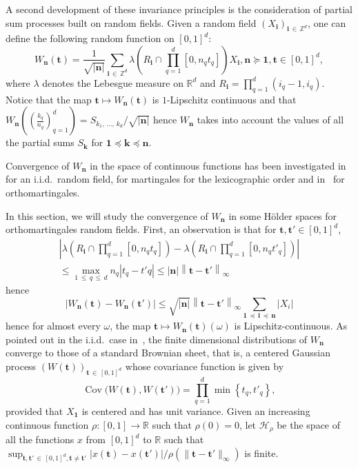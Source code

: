 \documentclass[AHL,Unicode,longabstracts,published]{cedram}
\newcommand{\Hca}{\mathcal{H}}
\newcommand\R{\mathbb{R}}
\newcommand\Z{\mathbb{Z}}
\newcommand\abs[1]{|#1|}
\newcommand{\pr}[1]{(#1)}
\newcommand{\norm}[1]{\lVert #1\rVert}
\newcommand{\gr}[1]{\bm{#1}}
\newcommand{\gri}{\bm{i}}
\newcommand{\grn}{\bm{n}}
\newcommand{\grk}{\bm{k}}
\newcommand{\grt}{\bm{t}}
\newcommand{\imd}{\preccurlyeq}
\newcommand{\smd}{\succcurlyeq }
\begin{document}
A second development of these invariance principles is the consideration of partial sum processes built on random fields. Given a random field $\pr{X_{\gri}}_{\gri\,\in\,\Z^d}$, one can define the following random function on $[0,1]^d$:
\begin{equation}
W_{\grn}\left(\grt\right)=\frac 1{\sqrt{\left|\grn\right|}}
\sum_{\gri\,\in\,\Z^d}
\lambda\left(R_{\gri}\cap \prod_{q=1}^d \left[0,n_qt_q\right]\right) X_{\gri}, \grn\smd\gr{1}, \grt \in [0,1]^d,
\end{equation}
where $\lambda$ denotes the Lebesgue measure on $\R^d$ and $R_{\gri}=\prod_{q=1}^d\pr{ i_q-1,i_q}$. Notice that the map $\grt\mapsto W_{\grn}\pr{\grt}$ is $1$-Lipschitz continuous and that $W_{\grn}\pr{\pr{\frac{k_q}{n_q}}_{q=1}^d}=S_{k_1,\,\dots,\,k_d}/\sqrt{\abs{\grn}}$ hence $W_{\grn}$ takes into account the values of all the partial sums $S_{\grk}$ for $\gr{1}\imd\gr{k}\imd\grn$.

Convergence of $W_{\grn}$ in the space of continuous functions has been investigated in~\cite{MR0246359} for an i.i.d.\ random field, \cite{MR1875665} for martingales for the lexicographic order and in~\cite{MR3427925,MR3913270} for orthomartingales.

In this section, we will study the convergence of $W_{\grn}$ in some H\"older spaces for orthomartingales random fields. First, an observation is that for $\grt,\gr{t'}\in [0,1]^d$,
\begin{multline}
\left| \lambda\left(R_{\gri}\cap \prod_{q=1}^d [0,n_qt_q]\right)- \lambda\left(R_{\gri}\cap \prod_{q=1}^d [0,n_qt'_q]\right)\right|\\
\leq \max_{1\,\leq\,q\,\leq\,d}n_q
\left|t_q-t'q\right|\leq \left|\grn\right|\left\|\grt-\gr{t'}\right\|_\infty
\end{multline}
hence
\begin{equation}
\left|W_{\grn}\left(\grt\right)-W_{\grn}\left(\gr{t'}\right)\right|
\leq \sqrt{\left|\grn\right|} \left\|\grt-\gr{t'}\right\|_\infty
\sum_{\gr{1}\,\imd\,\gri\,\imd\,\grn}\left|X_i\right|
\end{equation}
hence for almost every $\omega$, the map $\grt\mapsto W_{\grn}\pr{\grt}\pr{\omega}$ is Lipschitz-continuous. As pointed out in the i.i.d.\ case in~\cite{MR0246359}, the finite dimensional distributions of $W_{\grn}$ converge to those of a standard Brownian sheet, that is, a centered Gaussian process $\pr{W\pr{\grt}}_{\grt\,
\in\,[0,1]^d}$ whose covariance function is given by
\begin{equation}
\operatorname{Cov}\big(W\pr{\grt},W\pr{\gr{t'}}\big) =\prod_{q=1}^d\min\left\{t_q,t'_q\right\},
\end{equation}
provided that $X_{\gr{1}}$ is centered and has unit variance. Given an increasing continuous function $\rho\colon [0,1]\to\R$ such that $\rho\pr{0}=0$, let $\Hca_\rho$ be the space of all the functions $x$ from $[0,1]^d$ to $\R$ such that $\sup_{\grt,\gr{t'}\,\in\,[0,1]^d,
\grt\neq\gr{t'}}\abs{x\pr{\grt}-x\pr{\gr{t'}}}/
\rho\pr{\norm{\grt-\gr{t'}}_\infty }$ is finite.
\end{document}
